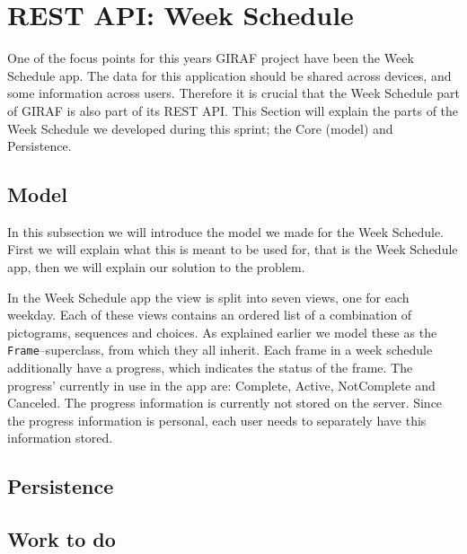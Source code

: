 \section{REST API: Week Schedule}\label{sec:restws}

One of the focus points for this years GIRAF project have been the Week Schedule app.
The data for this application should be shared across devices, and some information across users.
Therefore it is crucial that the Week Schedule part of GIRAF is also part of its REST API.
This Section will explain the parts of the Week Schedule we developed during this sprint; the Core (model) and Persistence. 

\subsection{Model}
In this subsection we will introduce the model we made for the Week Schedule.
First we will explain what this is meant to be used for, that is the Week Schedule app, then we will explain our solution to the problem. 

In the Week Schedule app the view is split into seven views, one for each weekday. 
Each of these views contains an ordered list of a combination of pictograms, sequences and choices.
As explained earlier we model these as the \texttt{Frame}--superclass, from which they all inherit. %
Each frame in a week schedule additionally have a progress, which indicates the status of the frame. 
The progress' currently in use in the app are: Complete, Active, NotComplete and Canceled. 
The progress information is currently not stored on the server. 
Since the progress information is personal, each user needs to separately have this information stored. 





\subsection{Persistence}



\subsection{Work to do} %


